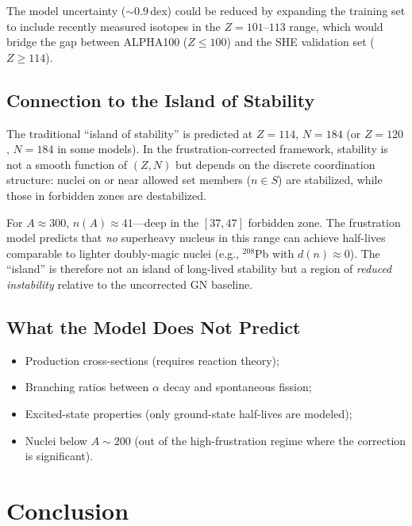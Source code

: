 \documentclass[12pt,a4paper,twocolumn]{revtex4-2}
\newcommand{\dn}{d(n)}
\begin{document}
The model uncertainty ($\sim 0.9$\,dex) could be reduced by
expanding the training set to include recently measured
isotopes in the $Z = 101$--$113$ range, which would
bridge the gap between ALPHA100 ($Z \leq 100$) and the
SHE validation set ($Z \geq 114$).

\subsection{Connection to the Island of Stability}

The traditional ``island of stability'' is predicted at
$Z = 114$, $N = 184$ (or $Z = 120$, $N = 184$ in some
models).  In the frustration-corrected framework, stability
is not a smooth function of $(Z, N)$ but depends on the
discrete coordination structure: nuclei on or near allowed
set members ($n \in S$) are stabilized, while those in
forbidden zones are destabilized.

For $A \approx 300$, $n(A) \approx 41$---deep in the
$[37, 47]$ forbidden zone.  The frustration model predicts
that \emph{no} superheavy nucleus in this range can achieve
half-lives comparable to lighter doubly-magic nuclei
(e.g., ${}^{208}$Pb with $\dn \approx 0$).
The ``island'' is therefore not an island of long-lived
stability but a region of \emph{reduced instability}
relative to the uncorrected GN baseline.

\subsection{What the Model Does Not Predict}

\begin{itemize}
\item Production cross-sections (requires reaction theory);
\item Branching ratios between $\alpha$ decay and
  spontaneous fission;
\item Excited-state properties (only ground-state
  half-lives are modeled);
\item Nuclei below $A \sim 200$ (out of the high-frustration
  regime where the correction is significant).
\end{itemize}

\section{Conclusion}
\label{sec:conclusion}
\end{document}
